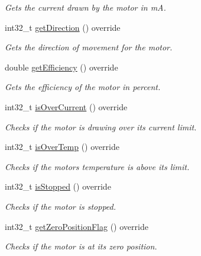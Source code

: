 \begin{DoxyCompactItemize}
\begin{DoxyCompactList}\small\item\em Gets the current drawn by the motor in mA. \end{DoxyCompactList}\item 
int32\+\_\+t \mbox{\hyperlink{classokapi_1_1ThreadedMockMotor_a06b43dc9e16e3e67b48d1fcb339128fb}{get\+Direction}} () override
\begin{DoxyCompactList}\small\item\em Gets the direction of movement for the motor. \end{DoxyCompactList}\item 
double \mbox{\hyperlink{classokapi_1_1ThreadedMockMotor_a09b93e115fc65434403ae220de5e5e22}{get\+Efficiency}} () override
\begin{DoxyCompactList}\small\item\em Gets the efficiency of the motor in percent. \end{DoxyCompactList}\item 
int32\+\_\+t \mbox{\hyperlink{classokapi_1_1ThreadedMockMotor_adfd72da84998458589114912eb2050af}{is\+Over\+Current}} () override
\begin{DoxyCompactList}\small\item\em Checks if the motor is drawing over its current limit. \end{DoxyCompactList}\item 
int32\+\_\+t \mbox{\hyperlink{classokapi_1_1ThreadedMockMotor_a65c4c3a0efd47a3f10d91865a2f471de}{is\+Over\+Temp}} () override
\begin{DoxyCompactList}\small\item\em Checks if the motor\textquotesingle{}s temperature is above its limit. \end{DoxyCompactList}\item 
int32\+\_\+t \mbox{\hyperlink{classokapi_1_1ThreadedMockMotor_ab60dbb6cb9d68196eb801aaa3cea1da8}{is\+Stopped}} () override
\begin{DoxyCompactList}\small\item\em Checks if the motor is stopped. \end{DoxyCompactList}\item 
int32\+\_\+t \mbox{\hyperlink{classokapi_1_1ThreadedMockMotor_a7433d665a1932327fa11b82e9f01d7b2}{get\+Zero\+Position\+Flag}} () override
\begin{DoxyCompactList}\small\item\em Checks if the motor is at its zero position. \end{DoxyCompactList}\item 

\end{DoxyCompactItemize}

